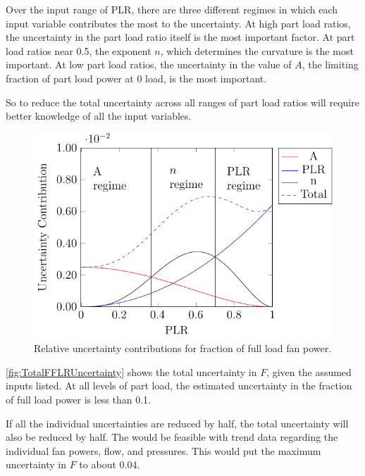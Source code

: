 Over the input range of PLR, there are three different regimes in which
each input variable contributes the most to the uncertainty. At high
part load ratios, the uncertainty in the part load ratio itself is the
most important factor. At part load ratios near 0.5, the exponent \(n\),
which determines the curvature is the most important. At low part load
ratios, the uncertainty in the value of \(A\), the limiting fraction of
part load power at 0 load, is the most important.

So to reduce the total uncertainty across all ranges of part load ratios
will require better knowledge of all the input variables.

\begin{figure}
\centering
\includegraphics[]{Plots/2017-05-15-FFLPUncertainty.pdf}
\caption{Relative uncertainty contributions for fraction of full load
fan power.}
\label{fig:FFLRUncertainty}
\end{figure}

\figref{} \ref{fig:TotalFFLRUncertainty} shows the total uncertainty in
\(F\), given the assumed inputs listed. At all levels of part load, the
estimated uncertainty in the fraction of full load power is less than
0.1.

If all the individual uncertainties are reduced by half, the total
uncertainty will also be reduced by half. The would be feasible with
trend data regarding the individual fan powers, flow, and pressures.
This would put the maximum uncertainty in \(F\) to about 0.04.

